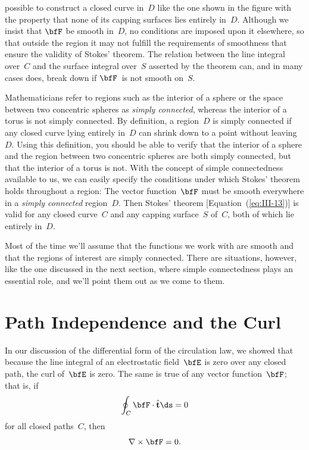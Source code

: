 \noindent possible to construct a closed curve in~$D$ like the one
shown in the figure with the property that none of its capping surfaces
lies entirely in~$D$.  Although we insist that $\bfF$ be smooth in~$D$,
no conditions are imposed upon it elsewhere, so that outside the region
it may not fulfill the requirements of smoothness that ensure the
validity of Stokes' theorem.  The relation between the line integral
over~$C$ and the surface integral over~$S$ asserted by the theorem can,
and in many cases does, break down if $\bfF$~is not smooth on~$S$.

Mathematicians refer to regions such as the interior of a sphere or
the space between two concentric spheres as \emph{simply connected},
whereas the interior of a torus is not simply connected.  By definition,
a region~$D$ is simply connected if any closed curve lying entirely
in~$D$ can shrink down to a point without leaving~$D$.  Using this
definition, you should be able to verify that the interior of a sphere
and the region between two concentric spheres are both simply connected,
but that the interior of a torus is not.  With the concept of simple
connectedness available to us, we can easily specify the conditions
under which Stokes' theorem holds throughout a region: The vector
function~$\bfF$ must be smooth everywhere in a \emph{simply connected}
region~$D$.  Then Stokes' theorem [Equation~(\ref{eq:III-13})] is valid
for any closed curve~$C$ and any capping surface~$S$ of~$C$, both of
which lie entirely in~$D$.

Most of the time we'll assume that the functions we work with are
smooth and that the regions of interest are simply connected.  There are
situations, however, like the one discussed in the next section, where
simple connectedness plays an essential role, and we'll point them out
as we come to them.


\section{Path Independence and the Curl}

In our discussion of the differential form of the circulation law, we
showed that because the line integral of an electrostatic field~$\bfE$
is zero over any closed path, the curl of~$\bfE$ is zero.  The same is
true of any vector function~$\bfF$; that is, if
\[
  \oint_C\bfF\cdot\hat{\mathbf{t}}\ds = 0
\]
for all closed paths~$C$, then
\[
  \nabla\times\bfF = 0.
\]

